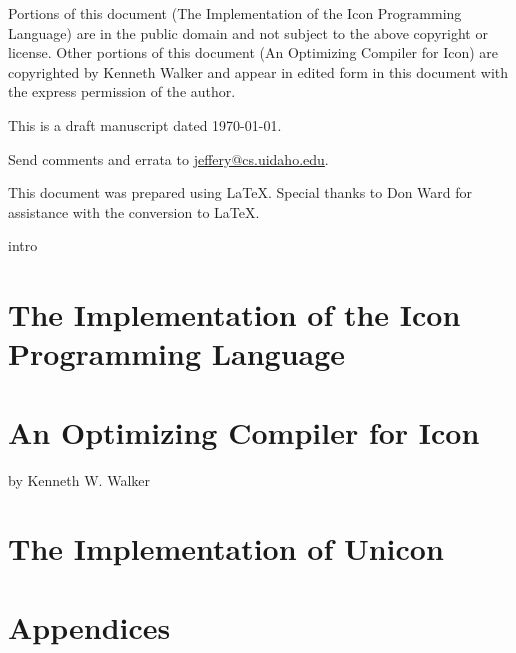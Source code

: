 \documentclass[letterpaper,twoside,12pt]{book}
\begin{document}
Portions of this document ({\textquotedbl}The Implementation of the
Icon Programming Language{\textquotedbl}) are in the public domain and
not subject to the above copyright or license. Other portions of this
document ({\textquotedbl}An Optimizing Compiler for
Icon{\textquotedbl}) are copyrighted by Kenneth Walker and appear in
edited form in this document with the express permission of the
author.


\bigskip

\noindent This is a draft manuscript dated \today.

\noindent Send comments and errata to
\href{mailto:jeffery@cs.uidaho.edu}{jeffery@cs.uidaho.edu}.

\bigskip

\noindent This document was prepared using \LaTeX. Special thanks to Don Ward
for assistance with the conversion to \LaTeX.

\setcounter{tocdepth}{3}
\tableofcontents


\mainmatter
 {intro}

\part{The Implementation of the Icon Programming Language}














\part{An Optimizing Compiler for Icon}
\bigskip
by Kenneth W. Walker
















\part{The Implementation of Unicon}




\part{Appendices}
\appendix












\clearpage
\bigskip
\backmatter

\printindex

\bigskip
\end{document}
